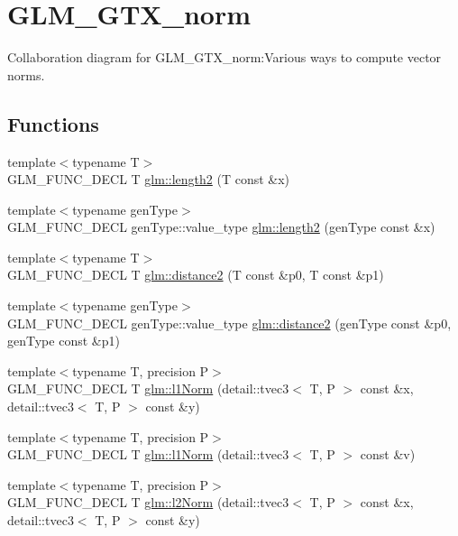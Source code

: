 \hypertarget{group__gtx__norm}{
\section{GLM\_\-GTX\_\-norm}
\label{group__gtx__norm}
}


Collaboration diagram for GLM\_\-GTX\_\-norm:Various ways to compute vector norms.  
\subsection*{Functions}
\begin{CompactItemize}
\item 
{\footnotesize template$<$typename T$>$ }\\GLM\_\-FUNC\_\-DECL T \hyperlink{group__gtx__norm_g6f970aba05e1299ed89d2ec3a410b7a9}{glm::length2} (T const \&x)
\item 
{\footnotesize template$<$typename genType$>$ }\\GLM\_\-FUNC\_\-DECL genType::value\_\-type \hyperlink{group__gtx__norm_g2dfcdff0cc9119aa37c501d2c7a45020}{glm::length2} (genType const \&x)
\item 
{\footnotesize template$<$typename T$>$ }\\GLM\_\-FUNC\_\-DECL T \hyperlink{group__gtx__norm_gaf6befa643aa9616f3c19e5548b11b54}{glm::distance2} (T const \&p0, T const \&p1)
\item 
{\footnotesize template$<$typename genType$>$ }\\GLM\_\-FUNC\_\-DECL genType::value\_\-type \hyperlink{group__gtx__norm_g205e08f24b9e35f9f892b563f2b8dd94}{glm::distance2} (genType const \&p0, genType const \&p1)
\item 
{\footnotesize template$<$typename T, precision P$>$ }\\GLM\_\-FUNC\_\-DECL T \hyperlink{group__gtx__norm_gf20fc187dfe66a474ecdba26e32ce4c6}{glm::l1Norm} (detail::tvec3$<$ T, P $>$ const \&x, detail::tvec3$<$ T, P $>$ const \&y)
\item 
{\footnotesize template$<$typename T, precision P$>$ }\\GLM\_\-FUNC\_\-DECL T \hyperlink{group__gtx__norm_g5a6d616a6e0340b9329d5018f04c1aca}{glm::l1Norm} (detail::tvec3$<$ T, P $>$ const \&v)
\item 
{\footnotesize template$<$typename T, precision P$>$ }\\GLM\_\-FUNC\_\-DECL T \hyperlink{group__gtx__norm_g2c87568b2888f01baf0133320c09b8ca}{glm::l2Norm} (detail::tvec3$<$ T, P $>$ const \&x, detail::tvec3$<$ T, P $>$ const \&y)

\end{CompactItemize}
